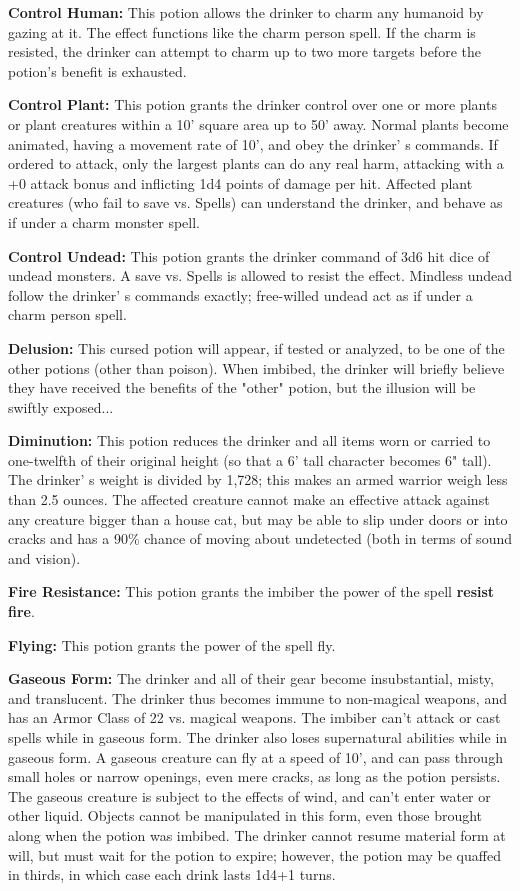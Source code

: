 \documentclass[a4paper,twoside,openany,10pt]{book}
\begin{document}
\begin{multicols}{2}
\textbf{Control Human:} This potion allows the drinker to charm any humanoid by gazing at it. The effect functions like the charm person spell. If the charm is resisted, the drinker can attempt to charm up to two more targets before the potion's benefit is exhausted.

\textbf{Control Plant: }This potion grants the drinker control over one or more plants or plant creatures within a 10' square area up to 50' away. Normal plants become animated, having a movement rate of 10', and obey the drinker' s commands. If ordered to attack, only the largest plants can do any real harm, attacking with a +0 attack bonus and inflicting 1d4 points of damage per hit. Affected plant creatures (who fail to save vs. Spells) can understand the drinker, and behave as if under a charm monster spell.

\textbf{Control Undead:} This potion grants the drinker command of 3d6 hit dice of undead monsters. A save vs. Spells is allowed to resist the effect. Mindless undead follow the drinker' s commands exactly; free-willed undead act as if under a charm person spell.

\textbf{Delusion: }This cursed potion will appear, if tested or analyzed, to be one of the other potions (other than poison). When imbibed, the drinker will briefly believe they have received the benefits of the "other" potion, but the illusion will be swiftly
exposed...

\textbf{Diminution:} This potion reduces the drinker and all items worn or carried to one-twelfth of their original height (so that a 6' tall character becomes 6" tall). The drinker' s weight is divided by 1,728; this makes an armed warrior weigh less than 2.5 ounces. The affected creature cannot make an effective attack against any creature bigger than a house cat, but may be able to slip under doors or into cracks and has a 90\% chance of moving about undetected (both in terms of sound and vision).

\textbf{Fire Resistance: }This potion grants the imbiber the power of the spell \textbf{resist fire}.

\textbf{Flying: }This potion grants the power of the spell fly.

\textbf{Gaseous Form:} The drinker and all of their gear become insubstantial, misty, and translucent. The drinker thus becomes immune to non-magical weapons, and has an Armor Class of 22 vs. magical weapons. The imbiber can't attack or cast spells while in gaseous form. The drinker also loses supernatural abilities while in gaseous form. A gaseous creature can fly at a speed of 10', and can pass through small holes or narrow openings, even mere cracks, as long as the potion persists. The gaseous creature is subject to the effects of wind, and can't enter water or other liquid. Objects cannot be manipulated in this form, even those brought along when the potion was imbibed. The drinker cannot resume material form at will, but must wait for the potion to expire; however, the potion may be quaffed in thirds, in which case each drink lasts 1d4+1 turns.


\end{multicols}
\end{document}
